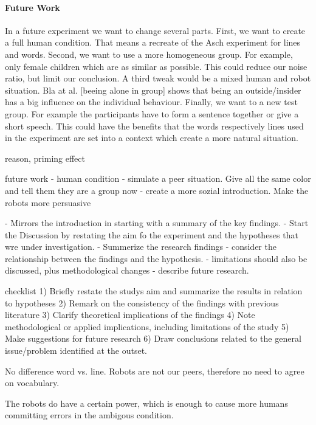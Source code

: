 \documentclass{acm_proc_article-sp}
\begin{document}
\paragraph{Future Work}In a future experiment we want to change several parts. First, we want to create a full human condition. That means a recreate of the Asch experiment for lines and words. Second, we want to use a more homogeneous group. For example, only female children which are as similar as possible. This could reduce our noise ratio, but limit our conclusion. A third tweak would be a mixed human and robot situation. Bla at al. [beeing alone in group] shows that being an outside/insider has a big influence on the individual behaviour. Finally, we want to a new test group. For example the participants have to form a sentence together or give a short speech. This could have the benefits that the words respectively lines used in the experiment are set into a context which create a more natural situation.



reason, priming effect


future work
- human condition
- simulate a peer situation. Give all the same color and tell them they are a group now
- create a more sozial introduction. Make the robots more persuasive


- Mirrors the introduction in starting with a summary of the key findings. 
- Start the Discussion by restating the aim fo the experiment and the hypotheses that wre under investigation.
- Summerize the research findings
- consider the relationship between the findings and the hypothesis. 
- limitations should also be discussed, plus methodological changes
- describe future research. 

checklist 
1) Briefly restate the studys aim and summarize the results in relation to hypotheses
2) Remark on the consistency of the findings with previous literature
3) Clarify theoretical implications of the findings
4) Note methodological or applied implications, including limitations of the study
5) Make suggestions for future research
6) Draw conclusions related to the general issue/problem identified at the outset.

No difference word vs. line.
Robots are not our peers, therefore no need to agree on vocabulary.

The robots do have a certain power, which is enough to cause more humans committing errors in the ambigous condition.
\end{document}
